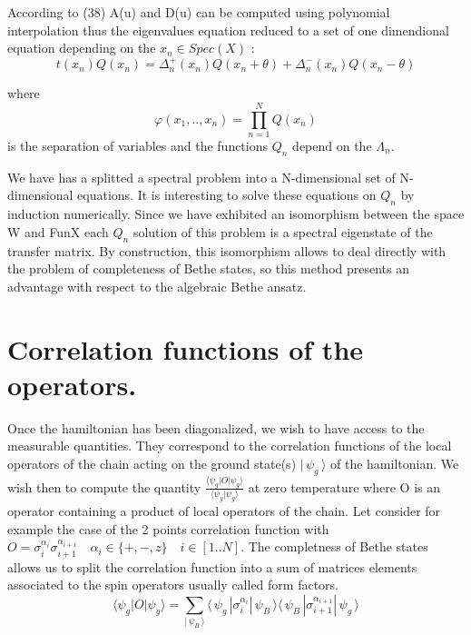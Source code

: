 \documentclass[12pt]{article}
\newcommand{\bra}[1]{\langle\,#1\,|}
\newcommand{\ket}[1]{|\,#1\,\rangle}
\begin{document}
 According to (38) A(u) and D(u) can be computed using polynomial interpolation thus the eigenvalues equation reduced to a set of one dimendional equation depending on the $x_{n} \in Spec(X)$ :
\begin{equation}
t(x_{n})Q(x_{n})=\Delta_{n}^{+}(x_{n})Q(x_{n}+\theta)+\Delta_{n}^{-}(x_{n})Q(x_{n}-\theta)
\end{equation}

where $$\varphi(x_{1},..,x_{n})=\prod_{n=1}^{N} Q(x_{n}) $$ is the separation of variables and the functions  $Q_{n}$ depend on the  $\Lambda_{n}$.

We have has a splitted a spectral problem into a N-dimensional set of N-dimensional equations. It is interesting to solve these  equations on $ Q_ {n} $ by induction numerically. Since we have exhibited an isomorphism between the space W and FunX each $Q_{n}$ solution of this problem is a spectral eigenstate of the transfer matrix. By construction, this isomorphism allows to deal directly with the problem of completeness of Bethe states, so this method presents an advantage with respect to the algebraic Bethe ansatz.  %

\section{Correlation functions of the operators.}
Once the hamiltonian has been diagonalized, we wish to have access to the measurable quantities. They correspond to the correlation functions of the local operators of the chain acting on the ground state(s) $\ket{\psi_{g}}$ of the hamiltonian. We wish then to compute the quantity $\frac{\langle\psi_{g}|O|\psi_{g}\rangle}{\langle\psi_{g}|\psi_{g}\rangle} $ at zero temperature where O is an operator containing a product of local operators of the chain.
Let consider for example the case of the 2 points correlation function with\\ $O=\sigma_{i}^{\alpha_i}\sigma_{i+1}^{\alpha_{i+1}} \quad \alpha_i \in\{+,-,z\} \quad i\in [1..N]$. The completness of Bethe states allows us to split the correlation function into a sum of matrices elements associated to the spin operators usually called form factors.
\begin{equation}
\langle\psi_{g}|O|\psi_{g}\rangle=\sum_{\ket{\psi_{B}}}\bra{\psi_{g}}\sigma_{i}^{\alpha_i}\ket{\psi_{B}}\bra{\psi_{B}}\sigma_{i+1}^{\alpha_{i+1}}\ket{\psi_{g}}
\end{equation}
\end{document}
